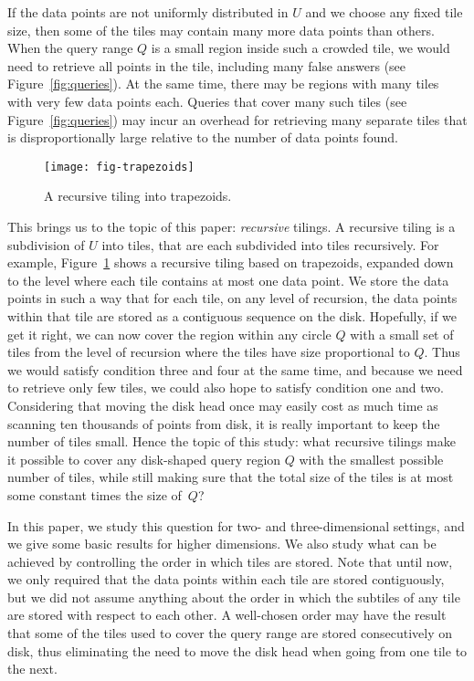 \documentclass[11pt,a4paper]{article}
\newcommand{\unittile}{\ensuremath{U}\xspace}
\begin{document}
If the data points are not uniformly distributed in \unittile and we choose any fixed tile size, then some of the tiles may contain many more data points than others. When the query range $Q$ is a small region inside such a crowded tile, we would need to retrieve all points in the tile, including many false answers (see Figure~\ref{fig:queries}). At the same time, there may be regions with many tiles with very few data points each. Queries that cover many such tiles (see Figure~\ref{fig:queries}) may incur an overhead for retrieving many separate tiles that is disproportionally large relative to the number of data points found.

\begin{figure}
\centering
\texttt{[image: fig-trapezoids]}
\caption{A recursive tiling into trapezoids.}
\label{fig:trapezoids}
\end{figure}

This brings us to the topic of this paper: \emph{recursive} tilings. A recursive tiling is a subdivision of \unittile into tiles, that are each subdivided into tiles recursively. For example, Figure~\ref{fig:trapezoids} shows a recursive tiling based on trapezoids, expanded down to the level where each tile contains at most one data point. We store the data points in such a way that for each tile, on any level of recursion, the data points within that tile are stored as a contiguous sequence on the disk. Hopefully, if we get it right, we can now cover the region within any circle $Q$ with a small set of tiles from the level of recursion where the tiles have size proportional to $Q$. Thus we would satisfy condition three and four at the same time, and because we need to retrieve only few tiles, we could also hope to satisfy condition one and two. Considering that moving the disk head once may easily cost as much time as scanning ten thousands of points from disk, it is really important to keep the number of tiles small. Hence the topic of this study: what recursive tilings make it possible to cover any disk-shaped query region $Q$ with the smallest possible number of tiles, while still making sure that the total size of the tiles is at most some constant times the size of~$Q$?

In this paper, we study this question for two- and three-dimensional settings, and we give some basic results for higher dimensions. We also study what can be achieved by controlling the order in which tiles are stored. Note that until now, we only required that the data points within each tile are stored contiguously, but we did not assume anything about the order in which the subtiles of any tile are stored with respect to each other. A well-chosen order may have the result that some of the tiles used to cover the query range are stored consecutively on disk, thus eliminating the need to move the disk head when going from one tile to the next.
\end{document}
